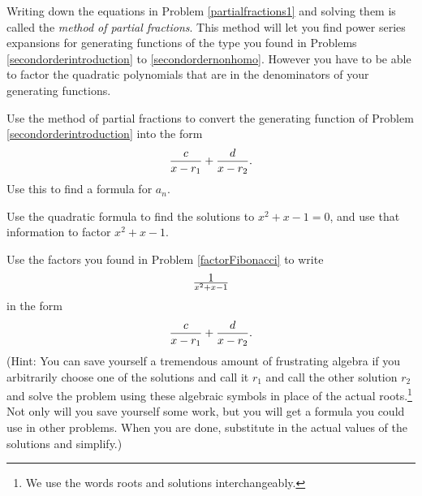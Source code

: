 \ep
Writing down the equations in Problem \ref{partialfractions1} and solving
them is called the {\em method of partial fractions}.  This method will let you find power series
expansions for generating functions of the type you found in Problems
\ref{secondorderintroduction} to
\ref{secondordernonhomo}.  However you have to be able to factor the
quadratic polynomials that are in the denominators of your generating
functions.  

\bp
\iteme Use the method of partial fractions to convert the generating
function of Problem \ref{secondorderintroduction} into the form
$${c\over x-r_1} + {d\over x-r_2}.$$  Use this
to find a formula for $a_n$.

\iteme Use the quadratic formula to find the solutions to $x^2+x-1=0$, and
use that information to factor $x^2+x-1$.\label{factorFibonacci}

\iteme Use the factors you found in Problem \ref{factorFibonacci}  to
write $$1\over x^2+x-1$$
in the form 
 $${c\over x-r_1} + {d\over x-r_2}.$$
(Hint:  You can save yourself a tremendous amount of frustrating algebra
if you arbitrarily choose one of the solutions and call it $r_1$ and
call the other solution $r_2$ and solve the problem using
these algebraic symbols in place of the actual roots.\footnote{We use the
words roots and solutions interchangeably.}  Not only will you save
yourself some work, but you will get a formula you could use in other
problems.  When you are done, substitute in the actual values of the
solutions and simplify.\label{fractionFibonacci})

